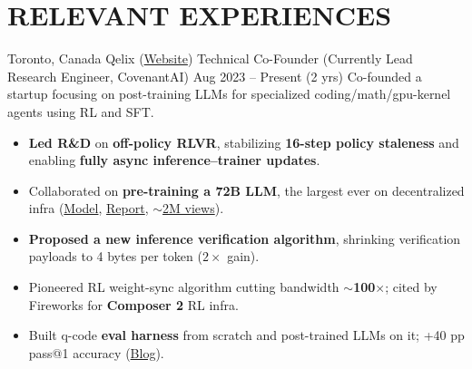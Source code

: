 \section{RELEVANT EXPERIENCES}

{\customcventry
    {Toronto, Canada}
    {Qelix (\href{https://qelix.ca}{Website})}
    {Technical Co-Founder (Currently Lead Research Engineer, CovenantAI)}
    {Aug 2023 – Present (2 yrs)}{}{}}
    Co-founded a startup focusing on post-training LLMs for specialized coding/math/gpu-kernel agents using RL and SFT.
    \begin{itemize}
        \item \textbf{Led R\&D} on \textbf{off-policy RLVR}, stabilizing \textbf{16-step policy staleness} and enabling \textbf{fully async inference–trainer updates}.
       \item Collaborated on \textbf{pre-training a 72B LLM}, the largest ever on decentralized infra (\href{https://huggingface.co/1Covenant/Covenant72B}{Model}, \href{https://arxiv.org/abs/2603.08163}{Report}, \href{https://x.com/tplr_ai/status/2031388295972929720}{$\sim$2M views}).
        \item \textbf{Proposed a new inference verification algorithm}, shrinking verification payloads to 4 bytes per token ($2\times$ gain).
        \item Pioneered RL weight-sync algorithm cutting bandwidth \textbf{$\sim$100$\times$}; cited by Fireworks for \textbf{Composer 2} RL infra.
        \item Built q-code \textbf{eval harness} from scratch and post-trained LLMs on it; +40 pp pass@1 accuracy (\href{https://medium.com/kx-systems/introducing-q-evaluation-harness-the-first-open-source-evaluation-framework-for-llms-on-q-kdb-01aa6099de4f}{Blog}).

\end{itemize}
